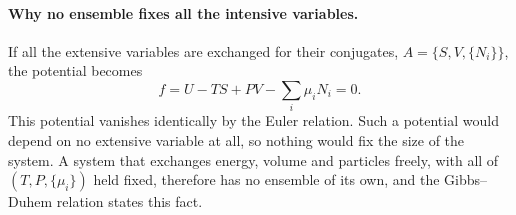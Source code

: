 \paragraph{Why no ensemble fixes all the intensive variables.}
If all the extensive variables are exchanged for their conjugates,
$A=\{S,V,\{N_i\}\}$, the potential becomes
\begin{equation*}
    f=U-TS+PV-\sum_i\mu_iN_i=0.
\end{equation*}
This potential vanishes identically by the Euler relation. Such a potential
would depend on no extensive variable at all, so nothing would fix the size
of the system. A system that exchanges energy, volume and particles freely,
with all of $(T,P,\{\mu_i\})$ held fixed, therefore has no ensemble of its
own, and the Gibbs--Duhem relation states this fact.

